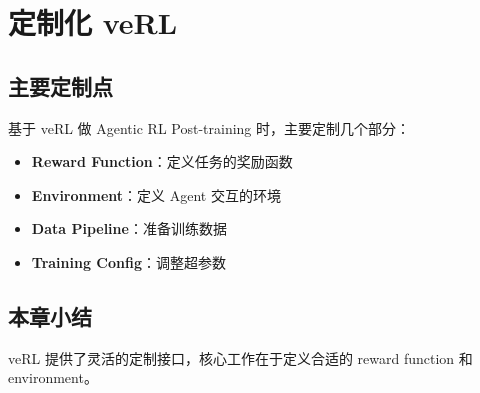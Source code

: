\section{定制化 veRL}
\subsection{主要定制点}
基于 veRL 做 Agentic RL Post-training 时，主要定制几个部分：
\begin{itemize}
  \item \textbf{Reward Function}：定义任务的奖励函数
  \item \textbf{Environment}：定义 Agent 交互的环境
  \item \textbf{Data Pipeline}：准备训练数据
  \item \textbf{Training Config}：调整超参数
\end{itemize}

\subsection{本章小结}
veRL 提供了灵活的定制接口，核心工作在于定义合适的 reward function 和 environment。

